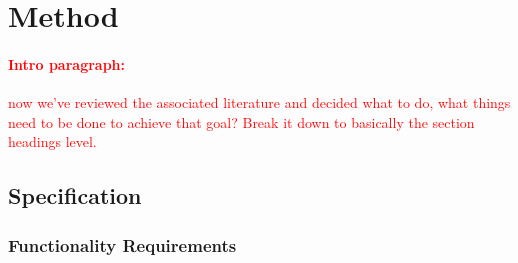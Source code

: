 \documentclass[12pt,a4,xcolor=table]{article}
\begin{document}
	\section{Method}
	\textcolor{red}{
	\paragraph{Intro paragraph:} now we've reviewed the associated literature and decided what to do, what things need to be done to achieve that goal? Break it down to basically the section headings level.}
	\subsection{Specification}
	\subsubsection{Functionality Requirements}
\end{document}
